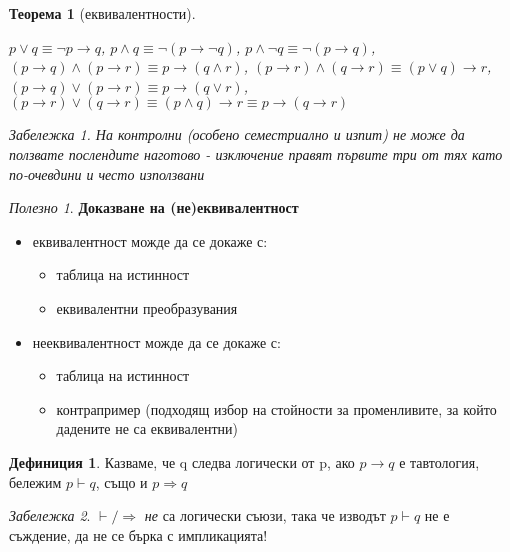 \documentclass[10pt, a4paper]{article}
\newtheorem{theorem}{Теорема}[section]
\theoremstyle{definition}
\newtheorem{definition}{Дефиниция}[section]
\theoremstyle{remark}
\newtheorem*{remark}{Забележка}
\newtheorem*{tip}{Полезно}
\begin{document}
\begin{theorem}[еквивалентности]
\begin{itemize}
        \(p\vee q \equiv \neg p \rightarrow q\), \(p\wedge q \equiv \neg (p \rightarrow \neg q)\), \(p\wedge \neg q \equiv \neg (p \rightarrow q)\),\\
        \((p \rightarrow q) \wedge (p \rightarrow r) \equiv p \rightarrow (q \wedge r)\), \((p \rightarrow r) \wedge (q \rightarrow r) \equiv (p \vee q) \rightarrow r\),\\ \((p \rightarrow q) \vee (p \rightarrow r) \equiv p \rightarrow (q \vee r)\), \((p \rightarrow r) \vee (q \rightarrow r) \equiv (p \wedge q) \rightarrow r \equiv p \rightarrow (q \rightarrow r)\)
        \begin{remark} На контролни (особено семестриално и изпит) не може да ползвате послендите наготово - изключение правят първите три от тях като по-очевдини и често използвани\end{remark}
    \end{itemize}
\end{theorem}
\hfill

\begin{tip}
\textbf{Доказване на (не)еквивалентност}
    \begin{itemize}
        \item еквивалентност можде да се докаже с:
            \begin{itemize}
                \item таблица на истинност
                \item еквивалентни преобразувания
            \end{itemize}
        \item нееквивалентност можде да се докаже с:
            \begin{itemize}
                \item таблица на истинност
                \item контрапример (подходящ избор на стойности за променливите, за който дадените не са еквивалентни)
            \end{itemize}
    \end{itemize}
\end{tip}

\begin{definition}
    Казваме, че q следва логически от p, ако \(p\rightarrow q\) е тавтология, бележим \(p\vdash q\), също и \(p\Rightarrow q\)
\end{definition}
\begin{remark}\(\vdash/ \Rightarrow\) \emph{не} са логически съюзи, така че изводът \(p\vdash q\) не е съждение, да не се бърка с импликацията!\end{remark}
\end{document}
